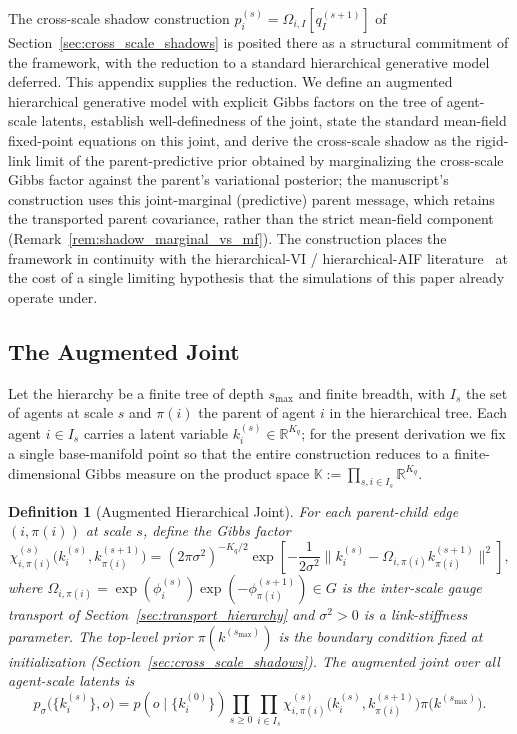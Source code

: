 \documentclass[11pt]{article}
\newtheorem{definition}{Definition}
\begin{document}
The cross-scale shadow construction $p_i^{(s)} = \Omega_{i,I}[q_I^{(s+1)}]$ of Section~\ref{sec:cross_scale_shadows} is posited there as a structural commitment of the framework, with the reduction to a standard hierarchical generative model deferred. This appendix supplies the reduction. We define an augmented hierarchical generative model with explicit Gibbs factors on the tree of agent-scale latents, establish well-definedness of the joint, state the standard mean-field fixed-point equations on this joint, and derive the cross-scale shadow as the rigid-link limit of the parent-predictive prior obtained by marginalizing the cross-scale Gibbs factor against the parent's variational posterior; the manuscript's construction uses this joint-marginal (predictive) parent message, which retains the transported parent covariance, rather than the strict mean-field component (Remark~\ref{rem:shadow_marginal_vs_mf}). The construction places the framework in continuity with the hierarchical-VI / hierarchical-AIF literature~\cite{Friston2017, parr2022active} at the cost of a single limiting hypothesis that the simulations of this paper already operate under.

\subsection{The Augmented Joint}

Let the hierarchy be a finite tree of depth $s_{\max}$ and finite breadth, with $I_s$ the set of agents at scale $s$ and $\pi(i)$ the parent of agent $i$ in the hierarchical tree. Each agent $i \in I_s$ carries a latent variable $k_i^{(s)} \in \mathbb{R}^{K_q}$; for the present derivation we fix a single base-manifold point so that the entire construction reduces to a finite-dimensional Gibbs measure on the product space $\mathbb{K} := \prod_{s, i \in I_s} \mathbb{R}^{K_q}$.

\begin{definition}[Augmented Hierarchical Joint]
\label{def:augmented_joint}
For each parent-child edge $(i, \pi(i))$ at scale $s$, define the Gibbs factor
\begin{equation}
\chi_{i,\pi(i)}^{(s)}\big(k_i^{(s)}, k_{\pi(i)}^{(s+1)}\big)
 = 
(2\pi\sigma^2)^{-K_q/2} \exp\left[-\frac{1}{2\sigma^2}
\big\|k_i^{(s)} - \Omega_{i,\pi(i)}  k_{\pi(i)}^{(s+1)}\big\|^2\right],
\label{eq:gibbs_factor}
\end{equation}
where $\Omega_{i,\pi(i)} = \exp(\phi_i^{(s)})\exp(-\phi_{\pi(i)}^{(s+1)}) \in G$ is the inter-scale gauge transport of Section~\ref{sec:transport_hierarchy} and $\sigma^2 > 0$ is a link-stiffness parameter. The top-level prior $\pi(k^{(s_{\max})})$ is the boundary condition fixed at initialization (Section~\ref{sec:cross_scale_shadows}). The augmented joint over all agent-scale latents is
\begin{equation}
p_{\sigma}\big(\{k_i^{(s)}\}, o\big)
 = 
p(o \mid \{k_i^{(0)}\}) \prod_{s \ge 0} \prod_{i \in I_s} \chi_{i,\pi(i)}^{(s)}\big(k_i^{(s)}, k_{\pi(i)}^{(s+1)}\big)  \pi\big(k^{(s_{\max})}\big).
\label{eq:augmented_joint}
\end{equation}
\end{definition}
\end{document}
